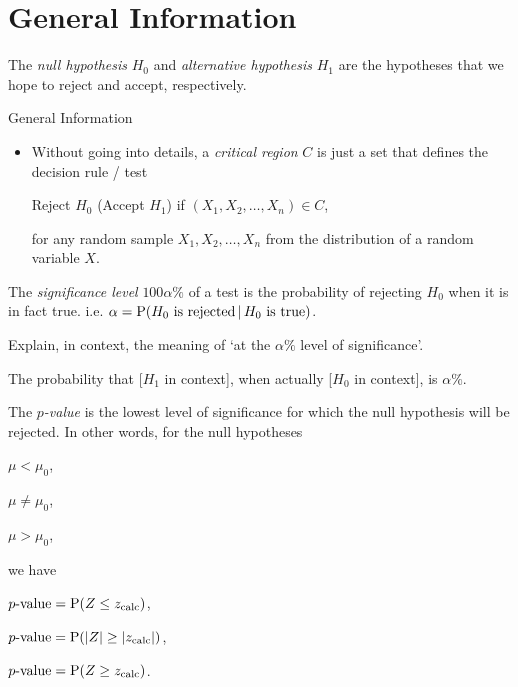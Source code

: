 \documentclass[../Notes.tex]{subfiles}
\begin{document}
\section{General Information}
\begin{definition}{}{}
  The \emph{null hypothesis} \(H_0\) and \emph{alternative hypothesis} \(H_1\) are the hypotheses that we hope to reject and accept, respectively. 
\end{definition}
\begin{stbox}{General Information}
  \begin{itemize}
    \item Without going into details, a \emph{critical region} \(C\) is just a set that defines the decision rule / test 
    \begin{center}
      Reject \(H_0\) (Accept \(H_1\)) \quad if \((X_1,X_2,\dots,X_n)\in C\),
    \end{center}
    for any random sample \(X_1,X_2,\dots,X_n\) from the distribution of a random variable \(X\).
  \end{itemize}
\end{stbox}
\begin{definition}{}{}
  The \emph{significance level} \(100\alpha\%\) of a test is the probability of rejecting \(H_0\) when it is in fact true. i.e. \(\alpha=\operatorname{P}(H_0\text{ is rejected}\,\vert\,H_0\text{ is true})\).
\end{definition}
\begin{note}
  Explain, in context, the meaning of `at the \(\alpha\%\) level of significance'.
  \begin{center}
    \parbox{0.9\textwidth}{
      The probability that [\(H_1\) in context], when actually [\(H_0\) in context], is \(\alpha\%\).
    }
  \end{center}
\end{note}
\begin{definition}{}{}
  The \emph{\(p\)-value} is the lowest level of significance for which the null hypothesis will be rejected. In other words, for the null hypotheses
    \begin{center}
      \begin{enumerate*}[label=(\alph*),itemjoin={\quad}]
        \item \(\mu<\mu_0\),
        \item \(\mu \neq \mu_0\),
        \item \(\mu>\mu_0\),
      \end{enumerate*}
    \end{center}
    we have
    \begin{center}
      \begin{enumerate*}[label=(\alph*),itemjoin={\quad}]
        \item \(p\text{-value}=\operatorname{P}(Z\leq z_\text{calc})\),
        \item \(p\text{-value}=\operatorname{P}(\lvert Z \rvert\geq \lvert z_\text{calc} \rvert)\),
        \item \(p\text{-value}=\operatorname{P}(Z\geq z_\text{calc})\).
      \end{enumerate*}
    \end{center}
\end{definition}
\end{document}
